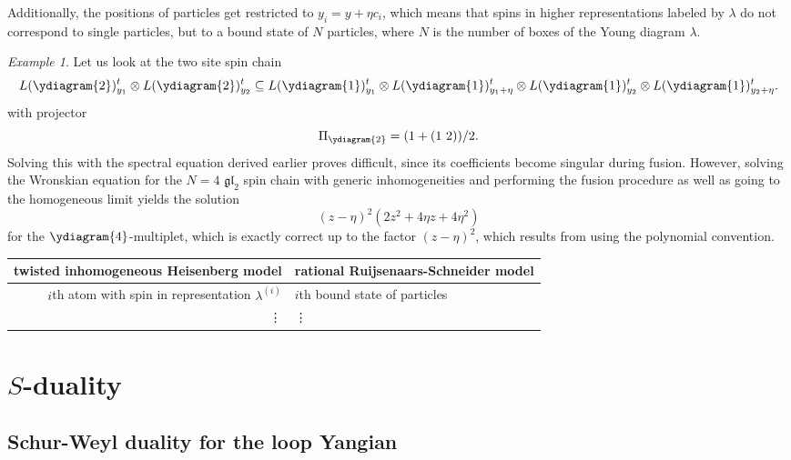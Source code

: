 \documentclass[11pt]{report}
\theoremstyle{definition}
\theoremstyle{remark}
\theoremstyle{remark}
\newtheorem*{example}{Example}
\begin{document}
Additionally, the positions of particles get restricted to $y_i = y + \eta c_i$, which means that spins in higher representations labeled by $\lambda$ do not correspond to single particles, but to a bound state of $N$ particles, where $N$ is the number of boxes of the Young diagram $\lambda$.

\begin{example}
Let us look at the two site spin chain
\begin{equation*}
L(\ydiagram{2})_{y_1}^t \otimes L(\ydiagram{2})_{y_2}^t \subseteq L(\ydiagram{1})_{y_1}^t \otimes L(\ydiagram{1})_{y_1+\eta}^t \otimes L(\ydiagram{1})_{y_2}^t \otimes L(\ydiagram{1})_{y_2+\eta}^t.
\end{equation*}
with projector
\begin{equation*}
\Pi_{\ydiagram{2}} = (1 + (1 \ 2))/2.
\end{equation*}
Solving this with the spectral equation derived earlier proves difficult, since its coefficients become singular during fusion. However, solving the Wronskian equation \cite{book:arutyunov:betheAnsatz} for the $N=4$ $\mathfrak{gl}_2$ spin chain with generic inhomogeneities and performing the fusion procedure as well as going to the homogeneous limit yields the solution
\begin{equation*}
(z-\eta)^2 (2 z^2 + 4 \eta z + 4 \eta^2)
\end{equation*}
for the $\ydiagram{4}$-multiplet, which is exactly correct up to the factor $(z-\eta)^2$, which results from using the polynomial convention.
\end{example}

\begin{center}
\begin{tabular}{|r||l|}
\hline
twisted inhomogeneous Heisenberg model & rational Ruijsenaars-Schneider model \\
\hline
$i$th atom with spin in representation $\lambda^{(i)}$ & $i$th bound state of particles \\
\vdots & \vdots \\
\hline
\end{tabular}
\end{center}

\section{$S$-duality}

\subsection{Schur-Weyl duality for the loop Yangian}
\end{document}

